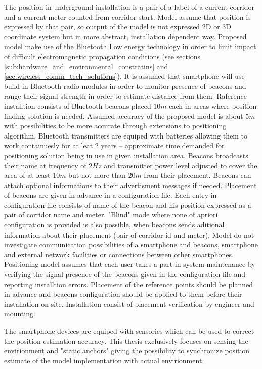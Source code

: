 \documentclass[../main.tex]{subfiles}
\begin{document}
The position in underground installation is a pair of a label of a current corridor and a current meter counted from corridor start. Model assume that position is expressed by that pair, so output of the model is not expressed 2D or 3D coordinate system but in more abstract, installation dependent way. Proposed model make use of the Bluetooth Low energy technology in order to limit impact of difficult electromagnetic propagation conditions (see sections \ref{sub:hardware_and_environmental_constratins} and \ref{sec:wireless_comm_tech_solutions}). It is assumed that smartphone will use build in Bluetooth radio modules in order to monitor presence of beacons and range their signal strength in order to estimate distance from them. Raference installtion consists of Bluetooth beacons placed $10m$ each in areas where position finding solution is needed. Assumed accuracy of the proposed model is about $5m$ with possibilities to be more accurate through extensions to positioning algorithm. Bluetooth transmitters are equiped with batteries allowing them to work containuesly for at leat 2 years -- approximate time demanded for positioning solution being in use in given installation area. Beacons broadcasts their name at frequency of $2Hz$ and transmitter power level adjusted to cover the area of at least $10m$ but not more than $20m$ from their placement. Beacons can attach optional informations to their advertisment messages if needed. Placement of beacons are given in advance in a configuration file. Each entry in configuration file consists of name of the beacon and his position expressed as a pair of corridor name and meter. "Blind" mode where none of apriori configuration is provided is also possible, when beacons sends aditional information about their placement (pair of corridor id and meter). Model do not investigate communication possibilities of a smartphone and beacons, smartphone and external network facilities or connections between other smartphones. Positioning model assumes that each user takes a part in system maintenance by verifying the signal presence of the beacons given in the configuration file and reporting installtion errors. Placement of the reference points should be planned in advance and beacons configuration should be applied to them before their installation on site. Installation consist of placement verification by engineer and mounting.

The smartphone devices are equiped with sensorics which can be used to correct the position estimation accuracy. This thesis exclusively focuses on sensing the envirionment and "static anchors" giving the possibility to synchronize position estimate of the model implementation with actual envirionment.
\end{document}

